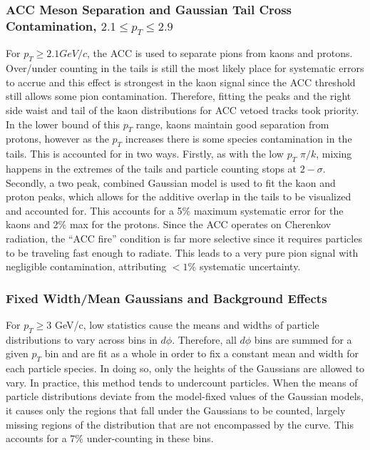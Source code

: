 \subsubsection{ACC Meson Separation and Gaussian Tail Cross Contamination, $2.1\leq p_T \leq 2.9$}
For $p_T \geq 2.1 GeV/c$, the ACC is used to separate pions from kaons and protons. Over/under counting in the tails is still the most likely place for systematic errors to accrue and this effect is strongest in the kaon signal since the ACC threshold still allows some pion contamination. Therefore, fitting the peaks and the right side waist and tail of the kaon distributions for ACC vetoed tracks took priority. In the lower bound of this $p_T$ range, kaons maintain good separation from protons, however as the $p_T$ increases there is some species contamination in the tails. This is accounted for in two ways. Firstly, as with the low $p_T$ $\pi / k$, mixing happens in the extremes of the tails and particle counting stops at $2-\sigma$. Secondly, a two peak, combined Gaussian model is used to fit the kaon and proton peaks, which allows for the additive overlap in the tails to be visualized and accounted for. This accounts for a 5\% maximum systematic error for the kaons and 2\% max for the protons. Since the ACC operates on Cherenkov radiation, the ``ACC fire'' condition is far more selective since it requires particles to be traveling fast enough to radiate. This leads to a very pure pion signal with negligible contamination, attributing $<1\%$ systematic uncertainty.

\subsubsection{Fixed Width/Mean Gaussians and Background Effects}
For $p_T \geq 3$ GeV/c, low statistics cause the means and widths of particle distributions to vary across bins in $d\phi$. Therefore, all $d\phi$ bins are summed for a given $p_T$ bin and are fit as a whole in order to fix a constant mean and width for each particle species. In doing so, only the heights of the Gaussians are allowed to vary. In practice, this method tends to undercount particles. When the means of particle distributions deviate from the model-fixed values of the Gaussian models, it causes only the regions that fall under the Gaussians to be counted, largely missing regions of the distribution that are not encompassed by the curve. This accounts for a 7\% under-counting in these bins.

